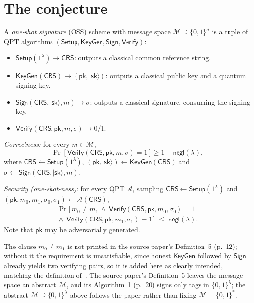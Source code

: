 \documentclass{aicr-conjecture}
\newcommand{\ket}[1]{\lvert #1 \rangle}
\newcommand{\negl}{\mathsf{negl}}
\newcommand{\Msp}{\mathcal{M}}
\newcommand{\Setup}{\mathsf{Setup}}
\newcommand{\KeyGen}{\mathsf{KeyGen}}
\newcommand{\Sign}{\mathsf{Sign}}
\newcommand{\Verify}{\mathsf{Verify}}
\newcommand{\CRS}{\mathsf{CRS}}
\newcommand{\pk}{\mathsf{pk}}
\newcommand{\sk}{\mathsf{sk}}
\begin{document}
\section{The conjecture}\label{sec:conjectures}

\begin{definition}\label{def:oss}
A \emph{one-shot signature} (OSS) scheme with message space $\Msp
\supseteq \{0,1\}^{\lambda}$ is a tuple of QPT algorithms $(\Setup,
\KeyGen, \Sign, \Verify)$:
\begin{itemize}[leftmargin=1.2em]
  \item $\Setup(1^{\lambda}) \to \CRS$: outputs a classical common
    reference string.
  \item $\KeyGen(\CRS) \to (\pk, \ket{\sk})$: outputs a classical
    public key and a quantum signing key.
  \item $\Sign(\CRS, \ket{\sk}, m) \to \sigma$: outputs a classical
    signature, consuming the signing key.
  \item $\Verify(\CRS, \pk, m, \sigma) \to 0/1$.
\end{itemize}
\emph{Correctness:} for every $m \in \Msp$,
\[
  \Pr[\Verify(\CRS, \pk, m, \sigma) = 1] \ge 1 - \negl(\lambda),
\]
where $\CRS \gets \Setup(1^{\lambda})$, $(\pk, \ket{\sk}) \gets
\KeyGen(\CRS)$ and $\sigma \gets \Sign(\CRS, \ket{\sk}, m)$.

\emph{Security (one-shot-ness):} for every QPT $\mathcal{A}$, sampling
$\CRS \gets \Setup(1^{\lambda})$ and $(\pk, m_{0}, m_{1}, \sigma_{0},
\sigma_{1}) \gets \mathcal{A}(\CRS)$,
\begin{multline*}
  \Pr\bigl[\, m_{0} \neq m_{1}
    \ \wedge\ \Verify(\CRS, \pk, m_{0}, \sigma_{0}) = 1 \\
    {}\wedge\ \Verify(\CRS, \pk, m_{1}, \sigma_{1}) = 1 \,\bigr]
    \;\le\; \negl(\lambda).
\end{multline*}
Note that $\pk$ may be adversarially generated.
\end{definition}

\begin{remark}\label{rem:oss}
The clause $m_{0} \neq m_{1}$ is not printed in the source paper's
Definition~5 (p.~12); without it the requirement is unsatisfiable,
since honest $\KeyGen$ followed by $\Sign$ already yields two
verifying pairs, so it is added here as clearly intended, matching the
definition of~\cite{AGKZ20}. The source paper's Definition~5 leaves
the message space an abstract $\Msp$, and its Algorithm~1 (p.~20)
signs only tags in $\{0,1\}^{\lambda}$; the abstract $\Msp \supseteq
\{0,1\}^{\lambda}$ above follows the paper rather than fixing $\Msp =
\{0,1\}^{*}$.
\end{remark}
\end{document}
